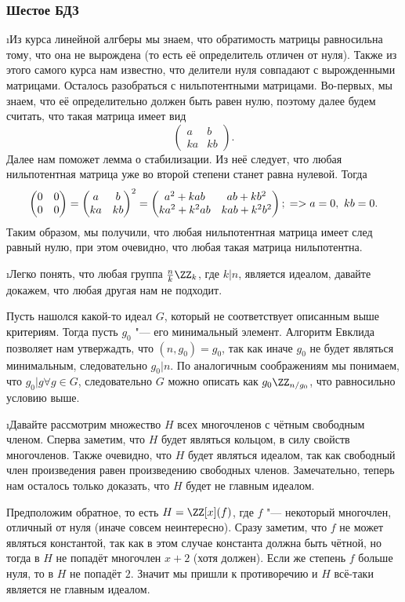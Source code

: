 \subsubsection{Шестое БДЗ}

\i Из курса линейной алгберы мы знаем, что обратимость матрицы равносильна тому, что она не вырождена (то есть её определитель отличен от нуля). Также из этого самого курса нам известно, что делители нуля совпадают с вырожденными матрицами. Осталось разобраться с нильпотентными матрицами. Во-первых, мы знаем, что её определительно должен быть равен нулю, поэтому далее будем считать, что такая матрица имеет вид 
$$
\begin{pmatrix}
a & b \\
ka & kb
\end{pmatrix}.
$$
Далее нам поможет лемма о стабилизации. Из неё следует, что любая нильпотентная матрица уже во второй степени станет равна нулевой. Тогда
$$
\begin{pmatrix}
    0 & 0 \\ 0 & 0
\end{pmatrix} = \begin{pmatrix}
    a & b \\
    ka & kb
\end{pmatrix}^2 = \begin{pmatrix}
    a^2 + kab & ab + kb^2\\
    ka^2 + k^2ab & kab + k^2b^2
\end{pmatrix};\\
=> a = 0,\ kb = 0.
$$
Таким образом, мы получили, что любая нильпотентная матрица имеет след равный нулю, при этом очевидно, что любая такая матрица нильпотентна.

\i Легко понять, что любая группа $\frac{n}{k}\ZZ_k$, где $k | n$, является идеалом, давайте докажем, что любая другая нам не подходит.
\par Пусть нашолся какой-то идеал $G$, который не соответствует описанным выше критериям. Тогда пусть $g_0$ "--- его минимальный элемент. Алгоритм Евклида позволяет нам утвержадть, что $(n, g_0) = g_0$, так как иначе $g_0$ не будет являться минимальным, следовательно $g_0 | n$. По аналогичным соображениям мы понимаем, что $g_0 | g \forall g \in G$, следовательно $G$ можно описать как $g_0\ZZ_{n/g_0}$, что равносильно условию выше.

\i Давайте рассмотрим множество $H$ всех многочленов с чётным свободным членом. Сперва заметим, что $H$ будет являться кольцом, в силу свойств многочленов. Также очевидно, что $H$ будет являться идеалом, так как свободный член произведения равен произведению свободных членов. Замечательно, теперь нам осталось только доказать, что $H$ будет не главным идеалом.
\par Предположим обратное, то есть $H = \ZZ[x](f)$, где $f$ "--- некоторый многочлен, отличный от нуля (иначе совсем неинтересно). Сразу заметим, что $f$ не может являться константой, так как в этом случае константа должна быть чётной, но тогда в $H$ не попадёт многочлен $x + 2$ (хотя должен). Если же степень $f$ больше нуля, то в $H$ не попадёт $2$. Значит мы пришли к противоречию и $H$ всё-таки является не главным идеалом.

